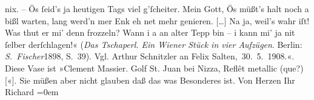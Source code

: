 \begin{ledgroupsized}[t]{13cm}
{{{                     nix. – Ös ſeid’s ja heutigen Tags viel g’ſcheiter. Mein Gott, Ös müßt’s halt
                     noch a bißl warten, lang werd’n mer Enk eh net mehr genieren. […] Na ja, weil’s
                     wahr iſt! Was thut er mi’ denn frozzeln? Wann i a an alter Tepp bin – i kann
                     mi’ ja nit ſelber derſchlagen!« (\emph{Das Tschaperl. Ein Wiener Stück in vier Aufzügen}. Berlin: 
                        \emph{S. Fischer}1898,
                        S. 39). Vgl. Arthur Schnitzler an Felix Salten, 30. 5. 1908.}}}\label{K_L00871-1h}«. Diese Vase ist
                  {\pb}»Clement Massier. Golf St.
                  Juan bei Nizza, Reflêt metallic
                  (que?){[}«{]}. Sie müßen aber nicht glauben daß das was Besonderes
               ist.\pend
           \pstart
           Von Herzen Ihr{\\[\baselineskip]}\spacefill\mbox{Richard}\pend
           \leftskip=0em{}
         
         \endnumbering{}\end{ledgroupsized}  \newcommand{\dateiname}{L00871}\newcommand{\titel}{Richard Beer-Hofmann an Arthur Schnitzler, 24. 12. 1898}\newcommand{\editorInnen}{Martin Anton Müller und Gerd-Hermann Susen}
      